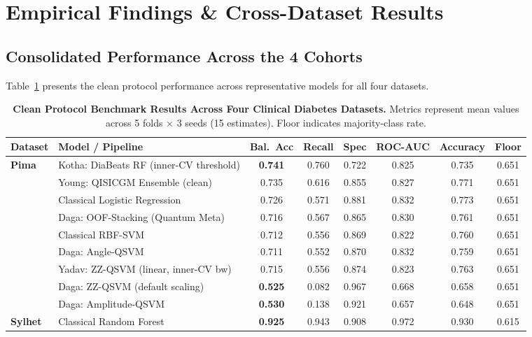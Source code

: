 \documentclass[11pt,a4paper]{article}
\newcommand{\BAD}[1]{\textcolor{bad}{\textbf{#1}}}
\begin{document}
\section{Empirical Findings \& Cross-Dataset Results}

\subsection{Consolidated Performance Across the 4 Cohorts}
Table~\ref{tab:clean_summary} presents the clean protocol performance across representative models for all four datasets.

\begin{table}[H]
\centering\footnotesize
\caption{\textbf{Clean Protocol Benchmark Results Across Four Clinical Diabetes Datasets.} Metrics represent mean values across 5 folds $\times$ 3 seeds (15 estimates). Floor indicates majority-class rate.}
\label{tab:clean_summary}
\begin{tabular}{llcccccc}
\toprule
\textbf{Dataset} & \textbf{Model / Pipeline} & \textbf{Bal.\ Acc} & \textbf{Recall} & \textbf{Spec} & \textbf{ROC-AUC} & \textbf{Accuracy} & \textbf{Floor} \\
\midrule
\multirow{6}{*}{\textbf{Pima}} 
& Kotha: DiaBeats RF (inner-CV threshold) & \textbf{0.741} & 0.760 & 0.722 & 0.825 & 0.735 & 0.651 \\
& Young: QISICGM Ensemble (clean) & 0.735 & 0.616 & 0.855 & 0.827 & 0.771 & 0.651 \\
& Classical Logistic Regression & 0.726 & 0.571 & 0.881 & 0.832 & 0.773 & 0.651 \\
& Daga: OOF-Stacking (Quantum Meta) & 0.716 & 0.567 & 0.865 & 0.830 & 0.761 & 0.651 \\
& Classical RBF-SVM & 0.712 & 0.556 & 0.869 & 0.822 & 0.760 & 0.651 \\
& Daga: Angle-QSVM & 0.711 & 0.552 & 0.870 & 0.832 & 0.759 & 0.651 \\
& Yadav: ZZ-QSVM (linear, inner-CV bw) & 0.715 & 0.556 & 0.874 & 0.823 & 0.763 & 0.651 \\
& Daga: ZZ-QSVM (default scaling) & \BAD{0.525} & 0.082 & 0.967 & 0.668 & 0.658 & 0.651 \\
& Daga: Amplitude-QSVM & \BAD{0.530} & 0.138 & 0.921 & 0.657 & 0.648 & 0.651 \\
\midrule
\multirow{6}{*}{\textbf{Sylhet}} 
& Classical Random Forest & \textbf{0.925} & 0.943 & 0.908 & 0.972 & 0.930 & 0.615 \\

\end{tabular}
\end{table}
\end{document}

